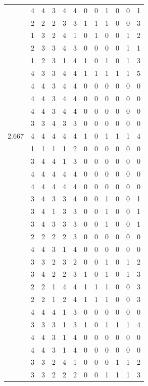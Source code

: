 \documentclass[]{msu-thesis}
\theoremstyle{definition}
\theoremstyle{definition}
\theoremstyle{definition}
\theoremstyle{remark}
\begin{document}
\begin{table}
{\begin{tabular}[t]{rrrrrrrrrrrr}
 & 4 & 4 & 3 & 4 & 4 & 0 & 0 & 1 & 0 & 0 & 1\\
 & 2 & 2 & 2 & 3 & 3 & 1 & 1 & 1 & 0 & 0 & 3\\
 & 1 & 3 & 2 & 4 & 1 & 0 & 1 & 0 & 0 & 1 & 2\\
 & 2 & 3 & 3 & 4 & 3 & 0 & 0 & 0 & 0 & 1 & 1\\
 & 1 & 2 & 3 & 1 & 4 & 1 & 0 & 1 & 0 & 1 & 3\\
 & 4 & 3 & 3 & 4 & 4 & 1 & 1 & 1 & 1 & 1 & 5\\
 & 4 & 4 & 3 & 4 & 4 & 0 & 0 & 0 & 0 & 0 & 0\\
 & 4 & 4 & 3 & 4 & 4 & 0 & 0 & 0 & 0 & 0 & 0\\
 & 4 & 4 & 3 & 4 & 4 & 0 & 0 & 0 & 0 & 0 & 0\\
 & 3 & 3 & 4 & 3 & 3 & 0 & 0 & 0 & 0 & 0 & 0\\
2.667 & 4 & 4 & 4 & 4 & 4 & 1 & 0 & 1 & 1 & 1 & 4\\
 & 1 & 1 & 1 & 1 & 2 & 0 & 0 & 0 & 0 & 0 & 0\\
 & 3 & 4 & 4 & 1 & 3 & 0 & 0 & 0 & 0 & 0 & 0\\
 & 4 & 4 & 4 & 4 & 4 & 0 & 0 & 0 & 0 & 0 & 0\\
 & 4 & 4 & 4 & 4 & 4 & 0 & 0 & 0 & 0 & 0 & 0\\
 & 3 & 4 & 3 & 3 & 4 & 0 & 0 & 1 & 0 & 0 & 1\\
 & 3 & 4 & 1 & 3 & 3 & 0 & 0 & 1 & 0 & 0 & 1\\
 & 3 & 4 & 3 & 3 & 3 & 0 & 0 & 1 & 0 & 0 & 1\\
 & 2 & 2 & 2 & 2 & 3 & 0 & 0 & 0 & 0 & 0 & 0\\
 & 4 & 4 & 3 & 1 & 4 & 0 & 0 & 0 & 0 & 0 & 0\\
 & 3 & 3 & 2 & 3 & 2 & 0 & 0 & 1 & 0 & 1 & 2\\
 & 3 & 4 & 2 & 2 & 3 & 1 & 0 & 1 & 0 & 1 & 3\\
 & 2 & 2 & 1 & 4 & 4 & 1 & 1 & 1 & 0 & 0 & 3\\
 & 2 & 2 & 1 & 2 & 4 & 1 & 1 & 1 & 0 & 0 & 3\\
 & 4 & 4 & 4 & 1 & 3 & 0 & 0 & 0 & 0 & 0 & 0\\
 & 3 & 3 & 3 & 1 & 3 & 1 & 0 & 1 & 1 & 1 & 4\\
 & 4 & 4 & 3 & 1 & 4 & 0 & 0 & 0 & 0 & 0 & 0\\
 & 4 & 4 & 3 & 1 & 4 & 0 & 0 & 0 & 0 & 0 & 0\\
 & 3 & 3 & 2 & 4 & 1 & 0 & 0 & 0 & 1 & 1 & 2\\
 & 3 & 3 & 2 & 2 & 2 & 0 & 0 & 1 & 1 & 1 & 3\\

\end{tabular}}
\end{table}
\end{document}
